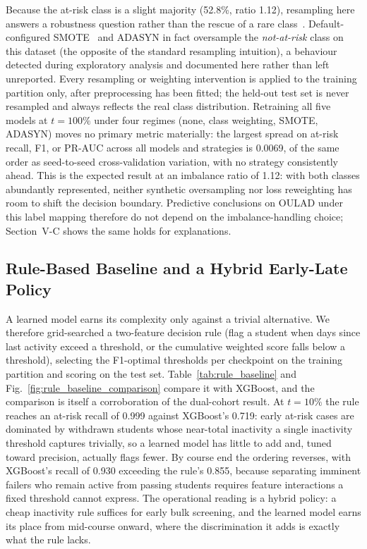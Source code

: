 \documentclass[conference]{IEEEtran}
\begin{document}
Because the at-risk class is a slight majority (52.8\%, ratio 1.12),
resampling here answers a robustness question rather than the rescue of a
rare class~\cite{he2009,fernandez2018}. Default-configured
SMOTE~\cite{chawla2002} and ADASYN in fact
oversample the \emph{not-at-risk} class on this dataset (the opposite of
the standard resampling intuition), a behaviour detected during exploratory
analysis and documented here rather than left unreported. Every resampling
or weighting intervention is applied to the training partition only, after
preprocessing has been fitted; the held-out test set is never resampled and
always reflects the real class distribution. Retraining all five models at
$t=100\%$ under four regimes (none, class weighting, SMOTE, ADASYN) moves
no primary metric materially: the largest spread on at-risk recall, F1, or
PR-AUC across all models and strategies is 0.0069, of the
same order as seed-to-seed cross-validation variation, with no strategy
consistently ahead. This is the expected result at an imbalance ratio of
1.12: with both classes abundantly represented, neither synthetic
oversampling nor loss reweighting has room to shift the decision boundary.
Predictive conclusions on OULAD under this label mapping therefore do not
depend on the imbalance-handling choice; Section~V-C shows the same holds
for explanations.

\subsection{Rule-Based Baseline and a Hybrid Early-Late Policy}

A learned model earns its complexity only against a trivial alternative. We
therefore grid-searched a two-feature decision rule (flag a student when
days since last activity exceed a threshold, or the cumulative weighted
score falls below a threshold), selecting the F1-optimal thresholds per
checkpoint on the training partition and scoring on the test set.
Table~\ref{tab:rule_baseline} and Fig.~\ref{fig:rule_baseline_comparison}
compare it with XGBoost, and the comparison is itself a corroboration of the
dual-cohort result. At $t=10\%$ the rule reaches an at-risk recall of
0.999 against XGBoost's 0.719: early
at-risk cases are dominated by withdrawn students whose near-total
inactivity a single inactivity threshold captures trivially, so a learned
model has little to add and, tuned toward precision, actually flags fewer.
By course end the ordering reverses, with XGBoost's recall of
0.930 exceeding the rule's 0.855,
because separating imminent failers who remain active from passing students
requires feature interactions a fixed threshold cannot express. The
operational reading is a hybrid policy: a cheap inactivity rule suffices for
early bulk screening, and the learned model earns its place from mid-course
onward, where the discrimination it adds is exactly what the rule lacks.
\end{document}
